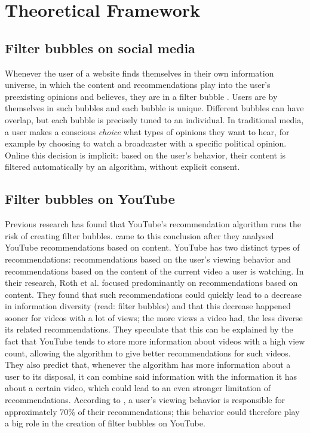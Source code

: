 \documentclass[../main.tex]{subfiles}
\begin{document}
\section{Theoretical Framework}
\subsection{Filter bubbles on social media}
Whenever the user of a website finds themselves in their own information universe, in which the content
and recommendations play into the user's preexisting opinions and believes, they are in a filter bubble
\citep{pariser2011filter}. Users are by themselves in such bubbles and each bubble is unique. Different
bubbles can have overlap, but each bubble is precisely tuned to an individual. In traditional media, a
user makes a conscious \textit{choice} what types of opinions they want to hear, for example by choosing
to watch a broadcaster with a specific political opinion. Online this decision is implicit: based on the
user's behavior, their content is filtered automatically by an algorithm, without explicit consent. 

\subsection{Filter bubbles on YouTube}
Previous research has found that YouTube's recommendation algorithm runs the risk of creating filter
bubbles. \citet{roth2020tubes} came to this conclusion after they analysed YouTube recommendations based
on content. YouTube has two distinct types of recommendations: recommendations based on the user's
viewing behavior and recommendations based on the content of the current video a user is watching. In
their research, Roth et al. focused predominantly on recommendations based on content. They found that
such recommendations could quickly lead to a decrease in information diversity (read: filter bubbles)
and that this decrease happened sooner for videos with a lot of views; the more views a video had, the
less diverse its related recommendations. They speculate that this can be explained by the fact that
YouTube tends to store more information about videos with a high view count, allowing the algorithm to
give better recommendations for such videos. They also predict that, whenever the algorithm has more
information about a user to its disposal, it can combine said information with the information it has
about a certain video, which could lead to an even stronger limitation of recommendations. According to
\citet{ledwich2019algorithmic}, a user's viewing behavior is responsible for approximately 70\% of their
recommendations; this behavior could therefore play a big role in the creation of filter bubbles on
YouTube. 
\end{document}
